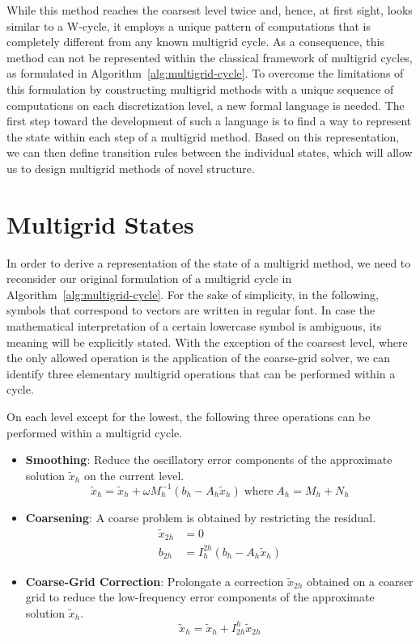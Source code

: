 While this method reaches the coarsest level twice and, hence, at first sight, looks similar to a W-cycle, it employs a unique pattern of computations that is completely different from any known multigrid cycle.
As a consequence, this method can not be represented within the classical framework of multigrid cycles, as formulated in Algorithm~\ref{alg:multigrid-cycle}.
To overcome the limitations of this formulation by constructing multigrid methods with a unique sequence of computations on each discretization level, a new formal language is needed.
The first step toward the development of such a language is to find a way to represent the state within each step of a multigrid method.
Based on this representation, we can then define transition rules between the individual states, which will allow us to design multigrid methods of novel structure.
\section{Multigrid States}
\label{sec:multigrid-states}
In order to derive a representation of the state of a multigrid method, we need to reconsider our original formulation of a multigrid cycle in Algorithm~\ref{alg:multigrid-cycle}.
For the sake of simplicity, in the following, symbols that correspond to vectors are written in regular font.
In case the mathematical interpretation of a certain lowercase symbol is ambiguous, its meaning will be explicitly stated. 
With the exception of the coarsest level, where the only allowed operation is the application of the coarse-grid solver, we can identify three elementary multigrid operations that can be performed within a cycle.
\begin{definition}
\label{def:elementary-multigrid-operations}
On each level except for the lowest, the following three operations can be performed within a multigrid cycle.
\begin{itemize}
	\item \textbf{Smoothing}: Reduce the oscillatory error components of the approximate solution $\tilde{x}_h$ on the current level. 
	\begin{equation}
		\tilde{x}_h = \tilde{x}_h + \omega M_h^{-1} \left( b_h - A_h \tilde{x}_h \right) \; \text{where} \; A_h = M_h + N_h
	\end{equation}
	\item \textbf{Coarsening}: A coarse problem is obtained by restricting the residual.
	\begin{equation}
    \begin{split}
     	\tilde{x}_{2h} & = 0 \\
		b_{2h} & = I_h^{2h} (b_h - A_h \tilde{x}_h)
    \end{split}
	\end{equation}
	\item \textbf{Coarse-Grid Correction}: Prolongate a correction $\tilde{x}_{2h}$ obtained on a coarser grid to reduce the low-frequency error components of the approximate solution $\tilde{x}_h$.
	\begin{equation}
		\tilde{x}_h = \tilde{x}_h + I_{2h}^h \tilde{x}_{2h}
	\end{equation}
\end{itemize}
\end{definition}
